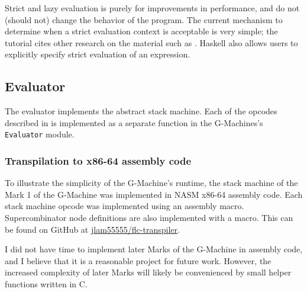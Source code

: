 Strict and lazy evaluation is purely for improvements in performance, and do not (should not) change the behavior of the program. The current mechanism to determine when a strict evaluation context is acceptable is very simple; the tutorial cites other research on the material such as \cite{burn1991lazy}. Haskell also allows users to explicitly specify strict evaluation of an expression.

\subsection{Evaluator}
\label{sec:evaluator}

The evaluator implements the abstract stack machine. Each of the opcodes described in  is implemented as a separate function in the G-Machines's \texttt{Evaluator} module.

\subsubsection{Transpilation to x86-64 assembly code}
\label{sec:gm-transpile-x86}

To illustrate the simplicity of the G-Machine's runtime, the stack machine of the Mark 1 of the G-Machine was implemented in NASM x86-64 assembly code. Each stack machine opcode was implemented using an assembly macro. Supercombinator node definitions are also implemented with a macro. This can be found on GitHub at \href{https://github.com/jlam55555/flc-transpiler}{jlam55555/flc-transpiler}.

I did not have time to implement later Marks of the G-Machine in assembly code, and I believe that it is a reasonable project for future work. However, the increased complexity of later Marks will likely be convenienced by small helper functions written in C.

